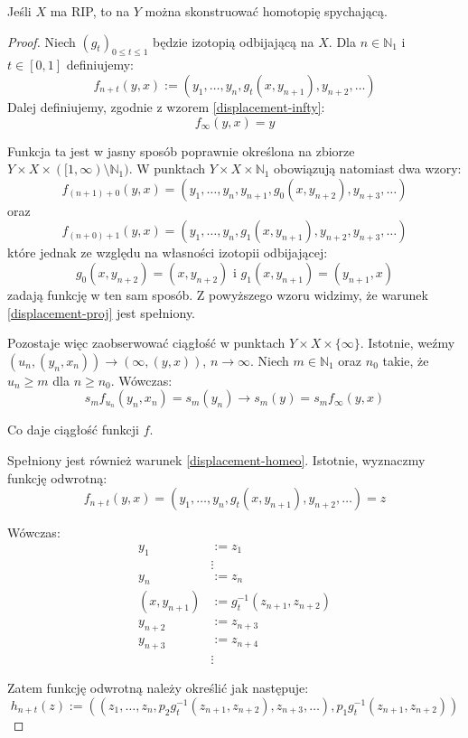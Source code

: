 \begin{thm}
  \label{thm:displacement-homotopy}
  Jeśli $X$ ma RIP, to na $Y$ można skonstruować homotopię spychającą.
  \begin{proof}
    Niech $(g_t)_{0 \leq t \leq 1}$ będzie izotopią odbijającą na $X$. Dla $n \in \mathbb{N}_1$ i $t \in [0,1]$ definiujemy:
    \[f_{n+t}(y,x) := (y_1, \ldots, y_n, g_t(x, y_{n+1}), y_{n+2}, \ldots)\]
    Dalej definiujemy, zgodnie z wzorem \ref{displacement-infty}:
    \[f_\infty(y,x) = y\]
    
    Funkcja ta jest w jasny sposób poprawnie określona na zbiorze $Y \times X \times ([1, \infty) \setminus \mathbb{N}_1)$. W punktach $Y \times X \times \mathbb{N}_1$ obowiązują natomiast dwa wzory:
    \[f_{(n+1) + 0}(y,x) = (y_1, \ldots, y_n, y_{n+1}, g_0(x, y_{n+2}), y_{n+3}, \ldots)\]
    oraz
    \[f_{(n+0) + 1}(y,x) = (y_1, \ldots, y_n, g_1(x, y_{n+1}), y_{n+2}, y_{n+3}, \ldots)\]
    które jednak ze względu na własności izotopii odbijającej:
    \[g_0(x, y_{n+2}) = (x, y_{n+2}) \mbox{ i } g_1(x, y_{n+1}) = (y_{n+1}, x)\]
    zadają funkcję w ten sam sposób. Z powyższego wzoru widzimy, że warunek \ref{displacement-proj} jest spełniony.
    
    Pozostaje więc zaobserwować ciągłość w punktach $Y \times X \times \{\infty\}$. Istotnie, weźmy $(u_n, (y_n, x_n)) \rightarrow (\infty, (y,x))$, $n \rightarrow \infty$. Niech $m \in \mathbb{N}_1$ oraz $n_0$ takie, że $u_n \geq m$ dla $n \geq n_0$. Wówczas:
    \[s_m f_{u_n}(y_n, x_n) = s_m(y_n) \rightarrow s_m(y) = s_m f_\infty (y,x)\]
    
    Co daje ciągłość funkcji $f$.
    
    Spełniony jest również warunek \ref{displacement-homeo}. Istotnie, wyznaczmy funkcję odwrotną:
    \[f_{n+t}(y,x) = (y_1, \ldots, y_n, g_t(x, y_{n+1}), y_{n+2}, \ldots) = z\]
    
    Wówczas:
    \begin{align*}
      y_1 &:= z_1 \\
      & \vdots \\
      y_n &:= z_n \\
      (x, y_{n+1}) &:= g_t^{-1}(z_{n+1}, z_{n+2}) \\
      y_{n+2} &:= z_{n+3} \\
      y_{n+3} &:= z_{n+4} \\
      & \vdots
    \end{align*}

    Zatem funkcję odwrotną należy określić jak następuje:
    \[h_{n+t}(z) := ((z_1, \ldots, z_n, p_2 g_t^{-1}(z_{n+1}, z_{n+2}), z_{n+3}, \ldots), p_1 g_t^{-1}(z_{n+1}, z_{n+2}))\]
    

\end{proof}
\end{thm}
